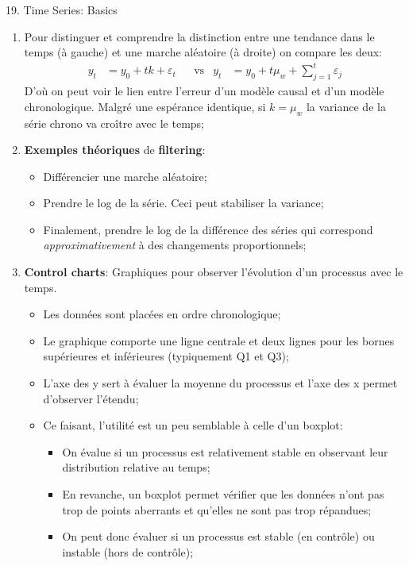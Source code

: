 \documentclass[12pt, titlepage, french]{report}
\begin{document}
\begin{CHPT_SUMM}{19. Time Series: Basics}
\begin{enumerate}
\begin{itemize}
		\item	On déduit de plus que la différence entre marches aléatoires $y_{t} - y_{t - 1}$ est du white noise;
		\end{itemize}
	\item[]	Pour distinguer et comprendre la distinction entre une tendance dans le temps (à gauche) et une marche aléatoire (à droite) on compare les deux:
	\begin{align*}
		y_{t}	&= 	y_{0} + t k + \varepsilon_{t}	&
		&\text{vs}	&
		y_{t}	&= 	y_{0} + t \mu_{w}  + \sum_{j = 1}^{t} \varepsilon_{j}	
	\end{align*}
	D'où on peut voir le lien entre l'erreur d'un modèle causal et d'un modèle chronologique. Malgré une espérance identique, si $k = \mu_{w}$ la variance de la série chrono va croître avec le temps;
	\item[]	\label{sec:ex_rand_walk} \textbf{Exemples théoriques} de \textbf{filtering}: 
		\begin{itemize}
		\item	Différencier une marche aléatoire;
		\item	Prendre le log de la série. Ceci peut stabiliser la variance;
		\item	Finalement, prendre le log de la différence des séries qui correspond \textit{approximativement} à des changements proportionnels;
		\end{itemize}
	\item	\textbf{Control charts}: Graphiques pour observer l'évolution d'un processus avec le temps.
		\begin{itemize}
		\item	Les données sont placées en ordre chronologique;
		\item	Le graphique comporte une ligne centrale et deux lignes pour les bornes supérieures et inférieures (typiquement Q1 et Q3);
		\item	L'axe des y sert à évaluer la moyenne du processus et l'axe des x permet d'observer l'étendu;
		\item	Ce faisant, l'utilité est un peu semblable à celle d'un boxplot:
			\begin{itemize}
			\item	On évalue si un processus est relativement stable en observant leur distribution relative au temps;
			\item	En revanche, un boxplot permet vérifier que les données n'ont pas trop de points aberrants et qu’elles ne sont pas trop répandues;
			\item	On peut donc évaluer si un processus est stable (en contrôle) ou instable (hors de contrôle);

\end{itemize}
\end{itemize}
\end{enumerate}
\end{CHPT_SUMM}
\end{document}
